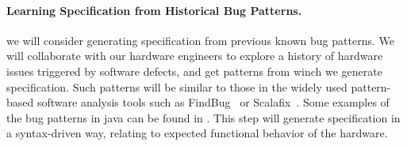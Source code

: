 \documentclass[fleqn,12pt]{article}
\begin{document}







\paragraph{Learning Specification from Historical Bug Patterns.}
we will consider generating specification from previous known bug
patterns.  We will collaborate with our hardware engineers to explore
a history of hardware issues triggered by software defects, and get
patterns from winch we generate specification. Such patterns will be
similar to those in the widely used pattern-based software analysis
tools such as FindBug~\cite{DBLP:conf/paste/AyewahPMPZ07} or
Scalafix~\cite{web:scalafix}. Some examples of the bug patterns in
java can be found in \cite{web:findbugs_bugs}. This step will generate
specification in a syntax-driven way, relating to expected functional
behavior of the hardware.

\end{document}
